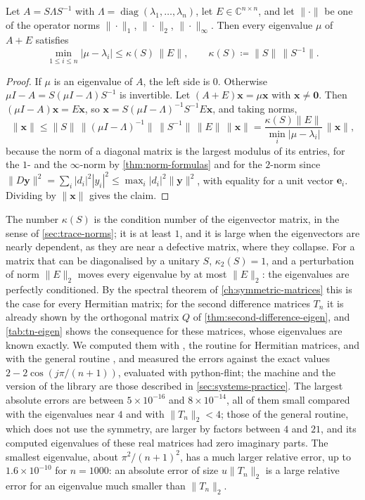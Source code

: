 \begin{theorem}
\label{thm:bauer-fike}
Let $A=S\Lambda S^{-1}$ with $\Lambda=\operatorname{diag}(\lambda_1,\ldots,\lambda_n)$, let $E\in\mathbb C^{n\times n}$, and let $\|\cdot\|$ be one of the operator norms $\|\cdot\|_1$, $\|\cdot\|_2$, $\|\cdot\|_\infty$. Then every eigenvalue $\mu$ of $A+E$ satisfies
\[
\min_{1\le i\le n}|\mu-\lambda_i|\le\kappa(S)\,\|E\|,\qquad\kappa(S)\coloneqq\|S\|\,\|S^{-1}\|.
\]
\end{theorem}

\begin{proof}
If $\mu$ is an eigenvalue of $A$, the left side is $0$. Otherwise $\mu I-A=S(\mu I-\Lambda)S^{-1}$ is invertible. Let $(A+E)\mathbf x=\mu\mathbf x$ with $\mathbf x\ne\mathbf 0$. Then $(\mu I-A)\mathbf x=E\mathbf x$, so $\mathbf x=S(\mu I-\Lambda)^{-1}S^{-1}E\mathbf x$, and taking norms,
\[
\|\mathbf x\|\le\|S\|\,\|(\mu I-\Lambda)^{-1}\|\,\|S^{-1}\|\,\|E\|\,\|\mathbf x\|=\frac{\kappa(S)\|E\|}{\min_i|\mu-\lambda_i|}\,\|\mathbf x\|,
\]
because the norm of a diagonal matrix is the largest modulus of its entries, for the $1$- and the $\infty$-norm by \cref{thm:norm-formulas} and for the $2$-norm since $\|D\mathbf y\|^2=\sum_i|d_i|^2|y_i|^2\le\max_i|d_i|^2\|\mathbf y\|^2$, with equality for a unit vector $\mathbf e_i$. Dividing by $\|\mathbf x\|$ gives the claim.
\end{proof}

The number $\kappa(S)$ is the condition number of the eigenvector matrix, in the sense of \cref{sec:trace-norms}; it is at least $1$, and it is large when the eigenvectors are nearly dependent, as they are near a defective matrix, where they collapse. For a matrix that can be diagonalised by a unitary $S$, $\kappa_2(S)=1$, and a perturbation of norm $\|E\|_2$ moves every eigenvalue by at most $\|E\|_2$: the eigenvalues are perfectly conditioned. By the spectral theorem of \cref{ch:symmetric-matrices} this is the case for every Hermitian matrix; for the second difference matrices $T_n$ it is already shown by the orthogonal matrix $Q$ of \cref{thm:second-difference-eigen}, and \cref{tab:tn-eigen} shows the consequence for these matrices, whose eigenvalues are known exactly. We computed them with , the routine for Hermitian matrices, and with the general routine , and measured the errors against the exact values $2-2\cos(j\pi/(n+1))$, evaluated with python-flint; the machine and the version of the library are those described in \cref{sec:systems-practice}. The largest absolute errors are between $5\times10^{-16}$ and $8\times10^{-14}$, all of them small compared with the eigenvalues near $4$ and with $\|T_n\|_2<4$; those of the general routine, which does not use the symmetry, are larger by factors between $4$ and $21$, and its computed eigenvalues of these real matrices had zero imaginary parts. The smallest eigenvalue, about $\pi^2/(n+1)^2$, has a much larger relative error, up to $1.6\times10^{-10}$ for $n=1000$: an absolute error of size $u\|T_n\|_2$ is a large relative error for an eigenvalue much smaller than $\|T_n\|_2$.

